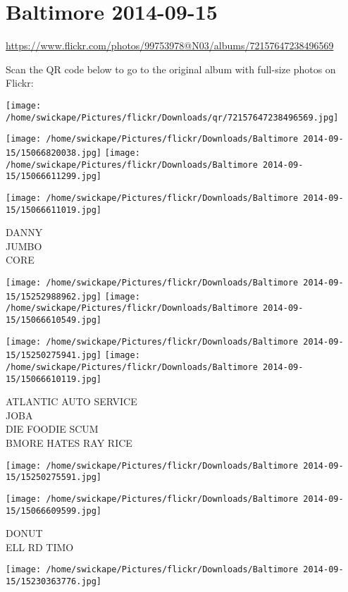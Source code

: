 \documentclass[10pt,letterpaper]{article}
\title{}
\author{}
\date{}
\begin{document}
\section*{Baltimore 2014-09-15}

\url{https://www.flickr.com/photos/99753978@N03/albums/72157647238496569}

Scan the QR code below to go to the original album with full-size photos on Flickr:

\texttt{[image: /home/swickape/Pictures/flickr/Downloads/qr/72157647238496569.jpg]}
\pagebreak

\texttt{[image: /home/swickape/Pictures/flickr/Downloads/Baltimore 2014-09-15/15066820038.jpg]}
\texttt{[image: /home/swickape/Pictures/flickr/Downloads/Baltimore 2014-09-15/15066611299.jpg]}

\vspace{0.25in}
\texttt{[image: /home/swickape/Pictures/flickr/Downloads/Baltimore 2014-09-15/15066611019.jpg]}

DANNY\\
JUMBO\\
CORE
\pagebreak

\texttt{[image: /home/swickape/Pictures/flickr/Downloads/Baltimore 2014-09-15/15252988962.jpg]}
\texttt{[image: /home/swickape/Pictures/flickr/Downloads/Baltimore 2014-09-15/15066610549.jpg]}

\texttt{[image: /home/swickape/Pictures/flickr/Downloads/Baltimore 2014-09-15/15250275941.jpg]}
\texttt{[image: /home/swickape/Pictures/flickr/Downloads/Baltimore 2014-09-15/15066610119.jpg]}

ATLANTIC AUTO SERVICE\\
JOBA\\
DIE FOODIE SCUM\\
BMORE HATES RAY RICE
\pagebreak

\texttt{[image: /home/swickape/Pictures/flickr/Downloads/Baltimore 2014-09-15/15250275591.jpg]}

\vspace{0.25in}
\texttt{[image: /home/swickape/Pictures/flickr/Downloads/Baltimore 2014-09-15/15066609599.jpg]}

DONUT\\
ELL RD TIMO
\pagebreak

\texttt{[image: /home/swickape/Pictures/flickr/Downloads/Baltimore 2014-09-15/15230363776.jpg]}
\end{document}
